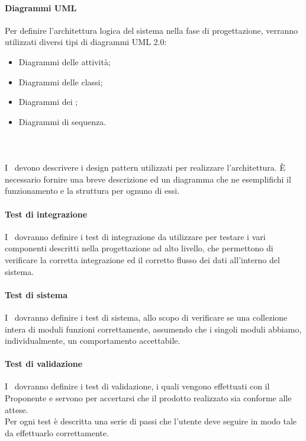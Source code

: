 \documentclass[../NormeDiProgetto.tex]{subfiles}
\begin{document}
			\paragraph{Diagrammi UML\\}
				Per definire l'architettura logica del sistema nella fase di progettazione,
				verranno utilizzati	diversi tipi di diagrammi UML 2.0:
				\begin{itemize}
					\item Diagrammi delle attività;
					\item Diagrammi delle classi;
					\item Diagrammi dei ;
					\item Diagrammi di sequenza.
				\end{itemize}
			
			\paragraph{\\}
				I \progettisti\ devono descrivere i design pattern utilizzati per realizzare l'architettura.
				È necessario fornire una breve descrizione ed un diagramma che ne esemplifichi il funzionamento e la struttura per ognuno di essi.
				
			\paragraph{Test di integrazione\\}   
				I \progettisti\ dovranno definire i test di integrazione da utilizzare per testare i vari
				componenti descritti nella progettazione ad alto livello, che permettono di verificare la
				corretta integrazione ed il corretto flusso dei dati all’interno del sistema.
				
			\paragraph{Test di sistema\\}       
			    I \progettisti\ dovranno definire i test di sistema, allo scopo di verificare se una collezione intera
			     di moduli funzioni correttamente, assumendo che i singoli moduli abbiamo, individualmente, un comportamento accettabile.
			    
			\paragraph{Test di validazione\\}    
				I \progettisti\ dovranno definire i test di validazione, i quali vengono effettuati con il Proponente e servono per accertarsi che il
				prodotto realizzato sia conforme alle attese. \\
				Per ogni test è descritta una serie di passi che l’utente deve seguire in modo tale da
				effettuarlo correttamente.
				
\end{document}
